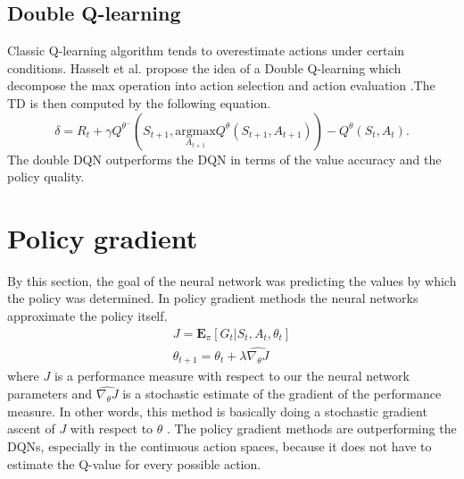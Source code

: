 \subsection{Double Q-learning}
Classic Q-learning algorithm tends to overestimate actions under certain conditions. Hasselt et al. propose the idea of a Double Q-learning which decompose the max operation into action selection and action evaluation \cite{hasselt2015}.The TD is then computed by the following equation.
\begin{equation}
\delta = R_{t} + \gamma Q^{\theta^-}(S_{t+1}, \underset{A_{t+1}}{\text{argmax}}Q^\theta(S_{t+1}, A_{t+1})) - Q^\theta (S_t, A_t).
\end{equation}
The double DQN outperforms the DQN in terms of the value accuracy and the policy quality.

\section{Policy gradient}
By this section, the goal of the neural network was predicting the values by which the policy was determined. In policy gradient methods the neural networks approximate the policy itself. 
\begin{align}
J = \mathbf{E}_\pi[G_t | S_t, A_t, \theta_t] \\
\theta_{t+1} = \theta_t + \lambda \widehat{\nabla_\theta J}
\end{align}
where $J$ is a performance measure with respect to our the neural network parameters and $\widehat{\nabla_{\theta} J}$ is a stochastic estimate of the gradient of the performance measure. In other words, this method is basically doing a stochastic gradient ascent of $J$ with respect to $\theta$ \cite{sutton1999}. The policy gradient methods are outperforming the DQNs, especially in the continuous action spaces, because it does not have to estimate the Q-value for every possible action.

